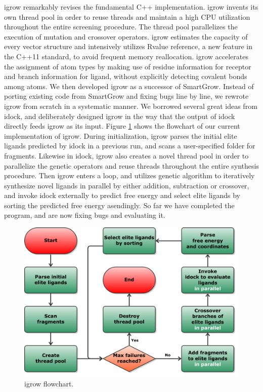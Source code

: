\documentclass[10pt, conference, compsocconf]{IEEEtran}
\begin{document}
igrow remarkably revises the fundamental C++ implementation. igrow invents its own thread pool in order to reuse threads and maintain a high CPU utilization throughout the entire screening procedure. The thread pool parallelizes the execution of mutation and crossover operators. igrow estimates the capacity of every vector structure and intensively utilizes Rvalue reference, a new feature in the C++11 standard, to avoid frequent memory reallocation. igrow accelerates the assignment of atom types by making use of residue information for receptor and branch information for ligand, without explicitly detecting covalent bonds among atoms.
We then developed igrow as a successor of SmartGrow. Instead of porting existing code from SmartGrow and fixing bugs line by line, we rewrote igrow from scratch in a systematic manner. We borrowed several great ideas from idock, and deliberately designed igrow in the way that the output of idock directly feeds igrow as its input. Figure \ref{igrow:Flowchart} shows the flowchart of our current implementation of igrow. During initialization, igrow parses the initial elite ligands predicted by idock in a previous run, and scans a user-specified folder for fragments. Likewise in idock, igrow also creates a novel thread pool in order to parallelize the genetic operators and reuse threads throughout the entire synthesis procedure. Then igrow enters a loop, and utilizes genetic algorithm to iteratively synthesize novel ligands in parallel by either addition, subtraction or crossover, and invoke idock externally to predict free energy and select elite ligands by sorting the predicted free energy asendingly. So far we have completed the program, and are now fixing bugs and evaluating it.

\begin{figure}
\centering
\includegraphics[width=\textwidth]{../igrow/Flowchart.pdf}
\caption{igrow flowchart.}
\label{igrow:Flowchart}
\end{figure}
\end{document}
